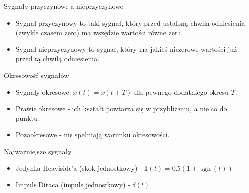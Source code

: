 \begin{frame}{Sygnały przyczynowe a nieprzyczynowe}
	\begin{itemize}
		\item[\bt] Sygnał przyczynowy to taki sygnał, który przed ustaloną chwilą odniesienia (zwykle czasem zero) ma wszędzie wartości równe zeru.
		\item[\bt] Sygnał nieprzyczynowy to sygnał, który ma jakieś niezerowe wartości już przed tą chwilą odniesienia.
	\end{itemize}
\end{frame}

\begin{frame}{Okresowość sygnałów}
	\begin{itemize}
		\item[\bt] Sygnały okresowe: $x(t) = x(t+T)$ dla pewnego dodatniego okresu $T$.
		\item[\bt] Prawie okresowe - ich kształt powtarza się w przybliżeniu, a nie co do punktu.
		\item[\bt] Pozaokresowe - nie spełniają warunku okresowości.
	\end{itemize}
\end{frame}

\begin{frame}{Najważniejsze sygnały}
	\begin{itemize}
		\item[\bt] Jedynka Heaviside'a (skok jednostkowy) - $\mathbf{1}(t)=0.5(1+\operatorname{sgn}(t))$
		\item[\bt] Impuls Diraca (impuls jednostkowy) - $\delta (t)$
	\end{itemize}
\end{frame}

